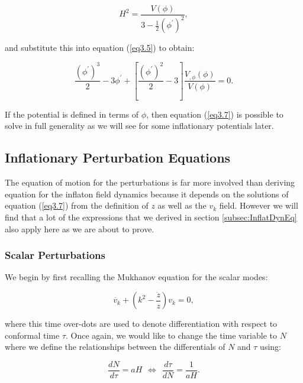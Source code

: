 \documentclass[a4paper,12pt,twoside]{report}
\begin{document}
\begin{equation} \label{eq3.6}
H^{2} = \frac{V(\phi)}{3 - \frac{1}{2} (\phi^{\prime})^{2}},
\end{equation}

and substitute this into equation (\ref{eq3.5}) to obtain:

\begin{equation}\label{eq3.7}
\frac{(\phi^{\prime})^{3}}{2} - 3\phi^{\prime} + \left[ \frac{(\phi^{\prime})^{2}}{2} - 3 \right]\frac{V_{,\phi}(\phi)}{V(\phi)} = 0.
\end{equation}

If the potential is defined in terms of $\phi$, then equation (\ref{eq3.7}) is possible to solve in full generality as we will see for some inflationary potentials later.

\subsection{Inflationary Perturbation Equations} \label{subsec:InflatPerturbEQ}

The equation of motion for the perturbations is far more involved than deriving equation for the inflaton field dynamics because it depends on the solutions of equation (\ref{eq3.7}) from the definition of $z$ as well as the $v_{k}$ field. However we will find that a lot of the expressions that we derived in section \ref{subsec:InflatDynEq} also apply here as we are about to prove.

\subsubsection{Scalar Perturbations} \label{subsubsec:ScalPerts}

We begin by first recalling the Mukhanov equation for the scalar modes:

\begin{equation} \label{eq3.8}
\ddot{v_{k}} + \left(k^{2} - \frac{\ddot{z}}{z} \right) v_{k} = 0,
\end{equation}

where this time over-dots are used to denote differentiation with respect to conformal time $\tau$. Once again, we would like to change the time variable to $N$ where we define the relationships between the differentials of $N$ and $\tau$ using:

\begin{equation} \label{eq3.9}
\frac{dN}{d\tau} = aH \hspace{5pt} \Leftrightarrow \hspace{5pt} \frac{d\tau}{dN} = \frac{1}{aH}.
\end{equation}
\end{document}
